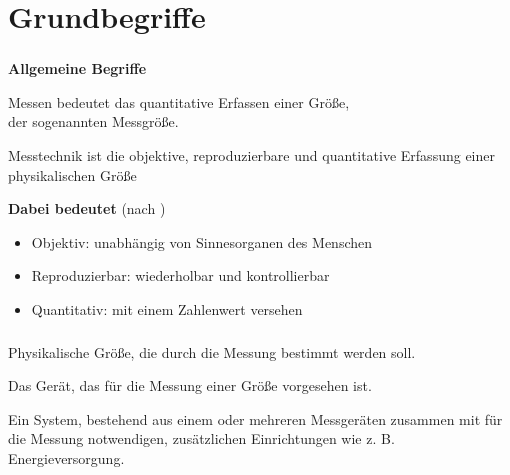 \section{Grundbegriffe}

\begin{frame}
    \frametitle{\insertsection}
    \textbf{Allgemeine Begriffe}\\
    \begin{definition}[Messen]
        \centering
        Messen bedeutet das quantitative Erfassen einer Größe,\\
        der sogenannten Messgröße.
    \end{definition}
    \begin{definition}[Messtechnik]
        \centering  
        Messtechnik ist die objektive, reproduzierbare und quantitative Erfassung einer physikalischen Größe
    \end{definition}
    \textbf{Dabei bedeutet} (nach \cite{muhl2017})\\
    \begin{itemize}
        \item Objektiv: unabhängig von Sinnesorganen des Menschen
        \item Reproduzierbar: wiederholbar und kontrollierbar
        \item Quantitativ: mit einem Zahlenwert versehen
    \end{itemize}
\end{frame}


\begin{frame}
    \frametitle{\insertsection}
    \begin{definition}
        \centering
        Physikalische Größe, die durch die Messung bestimmt werden soll.
    \end{definition}

    \begin{definition}
        \centering
        Das Gerät, das für die Messung einer Größe vorgesehen ist.
    \end{definition}

    \begin{definition}
        \centering
        Ein System, bestehend aus einem oder mehreren Messgeräten zusammen mit für die Messung notwendigen, zusätzlichen Einrichtungen wie z. B. Energieversorgung.
    \end{definition}
\end{frame}

